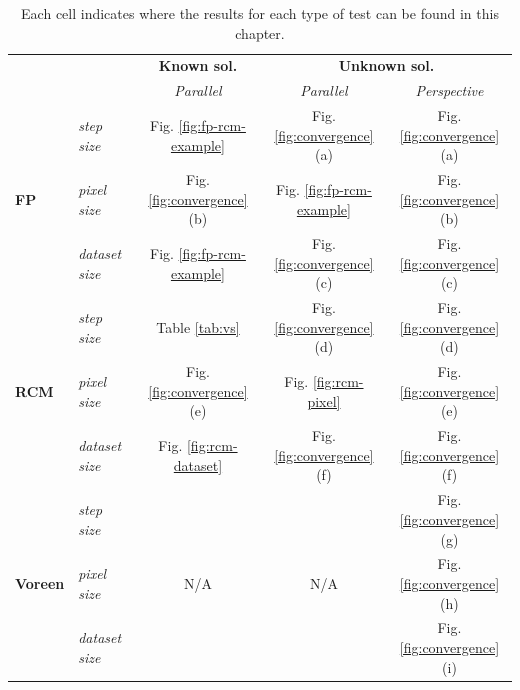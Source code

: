\begin{table}[t]
\caption{Each cell indicates where the results for each type of test
  can be found in this chapter.}
  \centering
\begin{tabular}{ l l | c | c c}
                              &                     & \textbf{Known sol.}             & \multicolumn{2}{c}{\textbf{Unknown sol.}}\\
                              &                     &  \emph{Parallel}                & \emph{Parallel} & \emph{Perspective}\\
\hline
\multirow{3}{*}{\bf{FP}}      & \emph{step size}    &  Fig. \ref{fig:fp-rcm-example} & Fig. \ref{fig:convergence}(a) & Fig. \ref{fig:convergence}(a)\\
                              & \emph{pixel size}   &  Fig. \ref{fig:convergence}(b) & Fig. \ref{fig:fp-rcm-example} & Fig. \ref{fig:convergence}(b)\\
                              & \emph{dataset size} &  Fig. \ref{fig:fp-rcm-example} & Fig. \ref{fig:convergence}(c) & Fig. \ref{fig:convergence}(c)\\
\hline
\multirow{3}{*}{\bf{RCM}}     & \emph{step size}    &  Table \ref{tab:vs}            & Fig. \ref{fig:convergence}(d) & Fig. \ref{fig:convergence}(d)\\
                              & \emph{pixel size}   &  Fig. \ref{fig:convergence}(e) & Fig. \ref{fig:rcm-pixel}       & Fig. \ref{fig:convergence}(e)\\
                              & \emph{dataset size} &  Fig. \ref{fig:rcm-dataset}    & Fig. \ref{fig:convergence}(f) & Fig. \ref{fig:convergence}(f)\\
\hline
\multirow{3}{*}{\bf{Voreen}}  & \emph{step size}    &  \multirow{3}{*}{N/A}          &   \multirow{3}{*}{N/A}         & Fig. \ref{fig:convergence}(g)\\
                              & \emph{pixel size}   &                                &                                & Fig. \ref{fig:convergence}(h)\\
                              & \emph{dataset size} &                                &                                & Fig. \ref{fig:convergence}(i)\\
\end{tabular}
\label{tab:summary}
\end{table}


